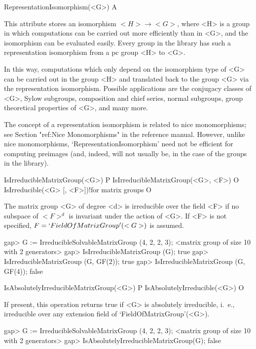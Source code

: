\>RepresentationIsomorphism(<G>) A

This attribute stores an isomorphism $<H> \to <G>$, where <H> is a group
in which computations can be carried out more efficiently than in <G>, and 
the isomorphism can be evaluated easily. Every group in the {\IRREDSOL} library
has such a representation isomorphism from a pc group <H> to <G>.

In this way, computations which only depend on the 
isomorphism type of <G> can be carried out in the group <H> and translated
back to the group <G> via the representation isomorphism. Possible applications are the conjugacy classes of <G>, Sylow subgroups, composition and chief series, normal subgroups, group theoretical properties of <G>, and many more. 

The concept of a representation isomorphism is related to 
nice monomorphisms; see Section "ref:Nice Monomorphisms" in the {\GAP} 
reference manual. However, unlike nice monomorphisms, 
`RepresentationIsomorphism' need not be efficient for computing preimages (and, indeed, will not usually be, in the case of the groups in the {\IRREDSOL} library). 



\>IsIrreducibleMatrixGroup(<G>) P
\>IsIrreducibleMatrixGroup(<G>, <F>) O
\>IsIrreducible(<G> [, <F>])!{for matrix groups} O

The matrix group <G> of degree <d> is irreducible over the field <F> if no subspace of $<F>^d$ is
invariant under the action of <G>. If <F> is not
specified, $F = `FieldOfMatrixGroup'(<G>)$ is assumed.

\beginexample
gap> G := IrreducibleSolvableMatrixGroup (4, 2, 2, 3);
<matrix group of size 10 with 2 generators>
gap> IsIrreducibleMatrixGroup (G);
true
gap> IsIrreducibleMatrixGroup (G, GF(2));
true
gap> IsIrreducibleMatrixGroup (G, GF(4));
false
\endexample

\>IsAbsolutelyIrreducibleMatrixGroup(<G>) P
\>IsAbsolutelyIrreducible(<G>) O

If present, this operation returns true if <G> is absolutely irreducible, i.~e., irreducible over any
extension field of `FieldOfMatrixGroup'(<G>).

\beginexample
gap> G := IrreducibleSolvableMatrixGroup (4, 2, 2, 3);
<matrix group of size 10 with 2 generators>
gap> IsAbsolutelyIrreducibleMatrixGroup(G);
false
\endexample

